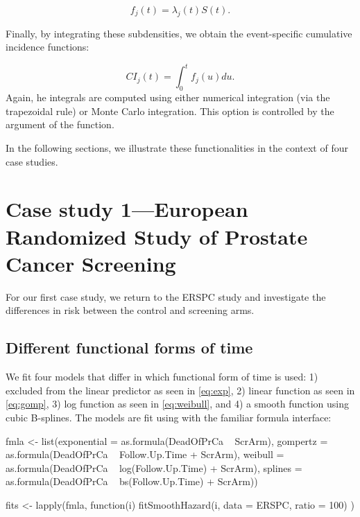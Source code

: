 \[ f_j(t) = \lambda_j(t)S(t).\]

Finally, by integrating these subdensities, we obtain the event-specific
cumulative incidence functions:

\[ CI_j(t) = \int_0^t f_j(u)du.\] Again, he integrals are computed using
either numerical integration (via the trapezoidal rule) or Monte Carlo
integration. This option is controlled by the argument  of
the  function.

In the following sections, we illustrate these functionalities in the
context of four case studies.

\hypertarget{case-study-1european-randomized-study-of-prostate-cancer-screening}{%
\section{Case study 1---European Randomized Study of Prostate Cancer
Screening}\label{case-study-1european-randomized-study-of-prostate-cancer-screening}}

For our first case study, we return to the ERSPC study and investigate
the differences in risk between the control and screening arms.

\hypertarget{different-functional-forms-of-time}{%
\subsection{Different functional forms of
time}\label{different-functional-forms-of-time}}

We fit four models that differ in which functional form of time is used:
1) excluded from the linear predictor as seen in \eqref{eq:exp}, 2)
linear function as seen in \eqref{eq:gomp}, 3) log function as seen in
\eqref{eq:weibull}, and 4) a smooth function using cubic B-splines. The
models are fit using  with the familiar formula
interface:

\begin{Schunk}
\begin{Sinput}
fmla <- list(exponential = as.formula(DeadOfPrCa ~ ScrArm),
             gompertz = as.formula(DeadOfPrCa ~ Follow.Up.Time + ScrArm),
             weibull = as.formula(DeadOfPrCa ~ log(Follow.Up.Time) + ScrArm),
             splines = as.formula(DeadOfPrCa ~ bs(Follow.Up.Time) + ScrArm))

fits <- lapply(fmla, function(i) {
  fitSmoothHazard(i, data = ERSPC, ratio = 100)
})
\end{Sinput}
\end{Schunk}

